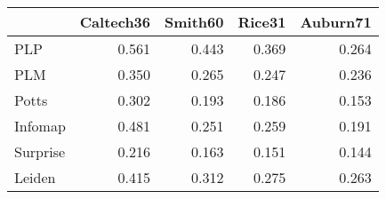 \begin{tabular}{lrrrr}
\toprule
{} & Caltech36 & Smith60 & Rice31 & Auburn71 \\
\midrule
PLP      &     0.561 &   0.443 &  0.369 &    0.264 \\
PLM      &     0.350 &   0.265 &  0.247 &    0.236 \\
Potts    &     0.302 &   0.193 &  0.186 &    0.153 \\
Infomap  &     0.481 &   0.251 &  0.259 &    0.191 \\
Surprise &     0.216 &   0.163 &  0.151 &    0.144 \\
Leiden   &     0.415 &   0.312 &  0.275 &    0.263 \\
\bottomrule
\end{tabular}
